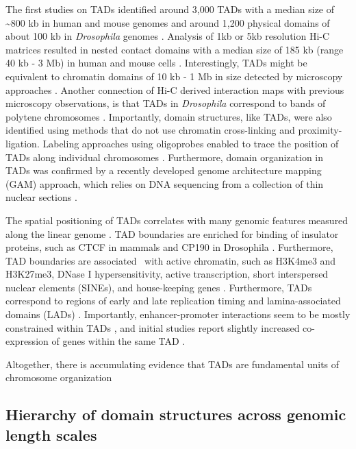 \documentclass[a4paper,twoside=true,openright,parskip=full,chapterprefix=true,11pt,headings=normal,bibliography=totoc,listof=totoc,titlepage=on,captions=tableabove,draft=false]{scrreprt}
\theoremstyle{definition}
\theoremstyle{definition}
\theoremstyle{definition}
\theoremstyle{remark}
\begin{document}
The first studies on TADs identified around 3,000 TADs with a median
size of \textasciitilde{}800 kb in human and mouse genomes
\citep{Dixon2012} and around 1,200 physical domains of about 100 kb in
\emph{Drosophila} genomes \citep{Sexton2012}. Analysis of 1kb or 5kb
resolution Hi-C matrices resulted in nested contact domains with a
median size of 185 kb (range 40 kb - 3 Mb) in human and mouse cells
\citep{Rao2014}. Interestingly, TADs might be equivalent to chromatin
domains of 10 kb - 1 Mb in size detected by microscopy approaches
\citep{Cremer2010, Gibcus2013}. Another connection of Hi-C derived
interaction maps with previous microscopy observations, is that TADs in
\emph{Drosophila} correspond to bands of polytene chromosomes
\citep{Eagen2015}. Importantly, domain structures, like TADs, were also
identified using methods that do not use chromatin cross-linking and
proximity-ligation. Labeling approaches using oligoprobes enabled to
trace the position of TADs along individual chromosomes
\citep{Wang2016d}. Furthermore, domain organization in TADs was
confirmed by a recently developed genome architecture mapping (GAM)
approach, which relies on DNA sequencing from a collection of thin
nuclear sections \citep{Beagrie2017}.

The spatial positioning of TADs correlates with many genomic features
measured along the linear genome \citep{Merkenschlager2016}. TAD
boundaries are enriched for binding of insulator proteins, such as CTCF
in mammals and CP190 in Drosophila \citep{Dixon2012, Sexton2012}.
Furthermore, TAD boundaries are associated~ with active chromatin, such
as H3K4me3 and H3K27me3, DNase I hypersensitivity, active transcription,
short interspersed nuclear elements (SINEs), and house-keeping genes
\citep{Dixon2012}. Furthermore, TADs correspond to regions of early and
late replication timing \citep{Pope2014, Dileep2015} and
lamina-associated domains (LADs) \citep{Dixon2012}. Importantly,
enhancer-promoter interactions seem to be mostly constrained within TADs
\citep{Shen2012, Ghavi-helm2014, Symmons2014}, and initial studies
report slightly increased co-expression of genes within the same TAD
\citep{Nora2012}.

Altogether, there is accumulating evidence that TADs are fundamental
units of chromosome organization \citep{Dixon2016}

\hypertarget{hierarchy-of-domain-structures-across-genomic-length-scales}{%
\subsection{Hierarchy of domain structures across genomic length
scales}\label{hierarchy-of-domain-structures-across-genomic-length-scales}}
\end{document}
